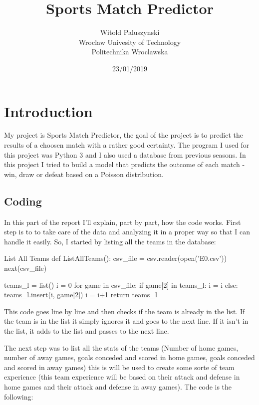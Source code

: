 \documentclass[12pt]{article}
\title{Sports Match Predictor}
\author{\makebox[.9\textwidth]{Rui Carapinha} \and Witold Paluszynski\\Wroclaw Univesity of Technology\\Politechnika Wroclawska}
\date{23/01/2019}
\begin{document}
\pdfpageheight   29.7cm
\pdfpagewidth    21cm
 
\maketitle

\section{Introduction}

My project is Sports Match Predictor, the goal of the project is to predict the results of a choosen match with a rather good certainty. The program I used for this project was Python 3 and I also used a database from previous seasons. In this project I tried to build a model that predicts the outcome of each match - win, draw or defeat based on a Poisson distribution.

\subsection{Coding}
In this part of the report I'll explain, part by part, how the code works. First step is to to take care of the data and analyzing it in a proper way so that I can handle it easily. So, I started by listing all the teams in the database:

\begin{codelisting}{List All Teams}
def ListAllTeams():
	csv_file = csv.reader(open('E0.csv'))
	next(csv_file)

	teams_l = list()
	i = 0
	for game in csv_file:
		if game[2] in teams_l:
			i = i
		else:
			teams_l.insert(i, game[2])
			i = i+1
	return teams_l
\end{codelisting}

This code goes line by line and then checks if the team is already in the list. If the team is in the list it simply ignores  it and goes to the next line. If it isn't in the list, it adds to the list and passes to the next line.

The next step was to list all the stats of the teams (Number of home games, number of away games, goals conceded and scored in home games, goals conceded and scored in away games) this is will be used to create some sorte of team experience (this team experience will be based on their attack and defense in home games and their attack and defense in away games). The code is the following:
\end{document}
